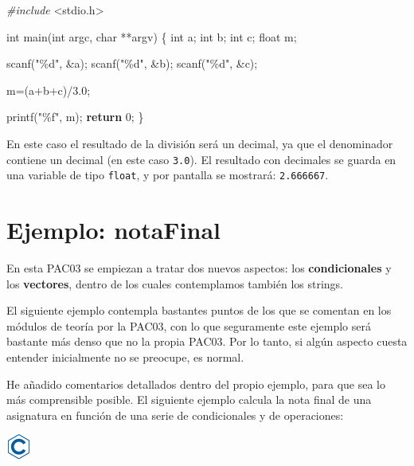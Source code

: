 \documentclass[
]{book}
\newenvironment{Shaded}{\begin{snugshade}}{\end{snugshade}}
\newcommand{\ControlFlowTok}[1]{\textcolor[rgb]{0.13,0.29,0.53}{\textbf{#1}}}
\newcommand{\DataTypeTok}[1]{\textcolor[rgb]{0.13,0.29,0.53}{#1}}
\newcommand{\DecValTok}[1]{\textcolor[rgb]{0.00,0.00,0.81}{#1}}
\newcommand{\FloatTok}[1]{\textcolor[rgb]{0.00,0.00,0.81}{#1}}
\newcommand{\ImportTok}[1]{#1}
\newcommand{\NormalTok}[1]{#1}
\newcommand{\PreprocessorTok}[1]{\textcolor[rgb]{0.56,0.35,0.01}{\textit{#1}}}
\newcommand{\StringTok}[1]{\textcolor[rgb]{0.31,0.60,0.02}{#1}}
\begin{document}
\begin{Shaded}
\begin{Highlighting}[]
\PreprocessorTok{\#include }\ImportTok{\textless{}stdio.h\textgreater{}}

\DataTypeTok{int}\NormalTok{ main(}\DataTypeTok{int}\NormalTok{ argc, }\DataTypeTok{char}\NormalTok{ **argv) \{}
    \DataTypeTok{int}\NormalTok{ a;}
    \DataTypeTok{int}\NormalTok{ b;}
    \DataTypeTok{int}\NormalTok{ c;}
    \DataTypeTok{float}\NormalTok{ m;}

\NormalTok{    scanf(}\StringTok{"\%d"}\NormalTok{, \&a);}
\NormalTok{    scanf(}\StringTok{"\%d"}\NormalTok{, \&b);}
\NormalTok{    scanf(}\StringTok{"\%d"}\NormalTok{, \&c);}

\NormalTok{    m=(a+b+c)/}\FloatTok{3.0}\NormalTok{;}

\NormalTok{    printf(}\StringTok{"\%f"}\NormalTok{, m);}
    \ControlFlowTok{return} \DecValTok{0}\NormalTok{;}
\NormalTok{\}}
\end{Highlighting}
\end{Shaded}

En este caso el resultado de la división será un decimal, ya que el denominador contiene un decimal (en este caso \texttt{3.0}). El resultado con decimales se guarda en una variable de tipo \texttt{float}, y por pantalla se mostrará: \texttt{2.666667}.

\hypertarget{ejemplo-notafinal}{%
\section{Ejemplo: notaFinal}\label{ejemplo-notafinal}}

En esta PAC03 se empiezan a tratar dos nuevos aspectos: los \textbf{condicionales} y los \textbf{vectores}, dentro de los cuales contemplamos también los strings.

El siguiente ejemplo contempla bastantes puntos de los que se comentan en los módulos de teoría por la PAC03, con lo que seguramente este ejemplo será bastante más denso que no la propia PAC03. Por lo tanto, si algún aspecto cuesta entender inicialmente no se preocupe, es normal.

He añadido comentarios detallados dentro del propio ejemplo, para que sea lo más comprensible posible. El siguiente ejemplo calcula la nota final de una asignatura en función de una serie de condicionales y de operaciones:

\includegraphics{./img/c.png}
\end{document}
